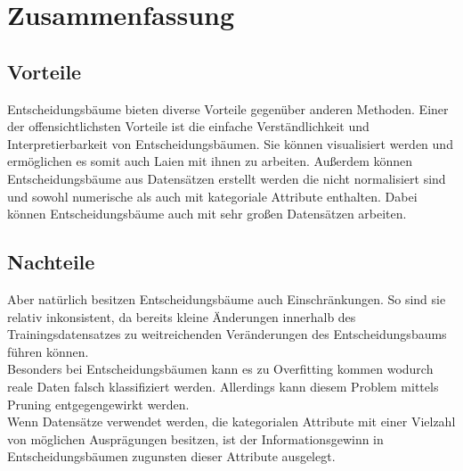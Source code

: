 \chapter{Zusammenfassung}
\label{zusammenfassung}

\section{Vorteile}
\label{vorteile}
Entscheidungsbäume bieten diverse Vorteile gegenüber anderen Methoden. Einer der offensichtlichsten Vorteile ist die einfache Verständlichkeit und Interpretierbarkeit von Entscheidungsbäumen. \autocite{DataMining} Sie können visualisiert werden und ermöglichen es somit auch Laien mit ihnen zu arbeiten. \autocite{PythonCourseDecisionTrees:online} Außerdem können Entscheidungsbäume aus Datensätzen erstellt werden die nicht normalisiert sind und sowohl numerische als auch mit kategoriale Attribute enthalten. Dabei können Entscheidungsbäume auch mit sehr großen Datensätzen arbeiten. \autocite{PythonCourseDecisionTrees:online}\\

\section{Nachteile}
\label{nachteile}
Aber natürlich besitzen Entscheidungsbäume auch Einschränkungen. So sind sie relativ inkonsistent, da bereits kleine Änderungen innerhalb des Trainingsdatensatzes zu weitreichenden Veränderungen des Entscheidungsbaums führen können. \autocite{PythonCourseDecisionTrees:online}\\
Besonders bei Entscheidungsbäumen kann es zu Overfitting kommen wodurch reale Daten falsch klassifiziert werden. Allerdings kann diesem Problem mittels Pruning entgegengewirkt werden. \autocite{DataMining}\\
Wenn Datensätze verwendet werden, die kategorialen Attribute mit einer Vielzahl von möglichen Ausprägungen besitzen, ist der Informationsgewinn in Entscheidungsbäumen zugunsten dieser Attribute ausgelegt.\autocite{PythonCourseDecisionTrees:online}